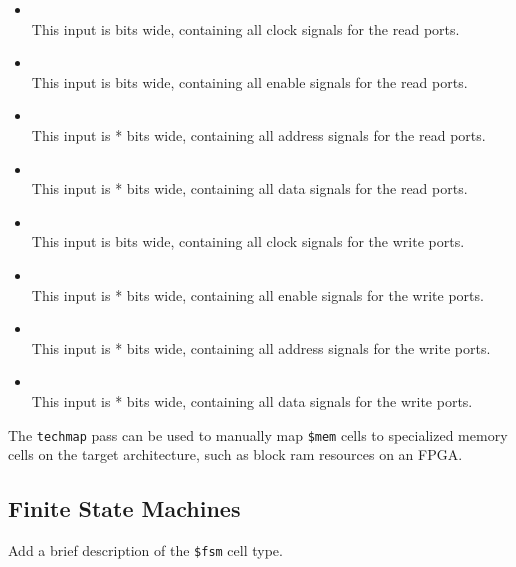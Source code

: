 \begin{itemize}
\item {} \\
This input is  bits wide, containing all clock signals for the read ports.

\item {} \\
This input is  bits wide, containing all enable signals for the read ports.

\item {} \\
This input is * bits wide, containing all address signals for the read ports.

\item {} \\
This input is * bits wide, containing all data signals for the read ports.

\item {} \\
This input is  bits wide, containing all clock signals for the write ports.

\item {} \\
This input is * bits wide, containing all enable signals for the write ports.

\item {} \\
This input is * bits wide, containing all address signals for the write ports.

\item {} \\
This input is * bits wide, containing all data signals for the write ports.
\end{itemize}

The {\tt techmap} pass can be used to manually map {\tt \$mem} cells to
specialized memory cells on the target architecture, such as block ram resources
on an FPGA.

\subsection{Finite State Machines}

\begin{fixme}
Add a brief description of the {\tt \$fsm} cell type.
\end{fixme}

